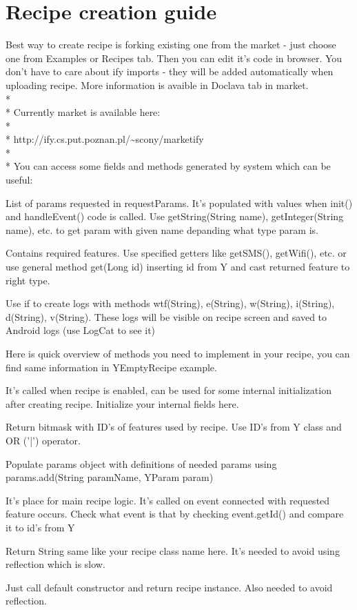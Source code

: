 \documentclass[11pt,a4paper,polish,thesis]{dcsbook}
\begin{document}
\chapter{Recipe creation guide}
Best way to create recipe is forking existing one from the market - just choose one from Examples or Recipes tab. Then you can edit it's code in browser. You don't have to care about ify imports - they will be added automatically when uploading recipe. More information is avaible in Doclava tab in market. \\*\\*
Currently market is available here:\\*\\*
http://ify.cs.put.poznan.pl/\textasciitilde scony/marketify\\*\\*
You can access some fields and methods generated by system which can be useful:
\begin{description}[style=nextline]
\item[getParams()] 
List of params requested in requestParams. It's populated with values when init() and handleEvent() code is called. Use getString(String name), getInteger(String name), etc. to get param with given name depanding what type param is.
\item[getFeatures()] 
Contains required features. Use specified getters like getSMS(), getWifi(), etc. or use general method get(Long id) inserting id from Y and cast returned feature to right type.
\item[Log (it's field)]
Use if to create logs with methods wtf(String), e(String), w(String), i(String), d(String), v(String). These logs will be visible on recipe screen and saved to Android logs (use LogCat to see it)
\end{description}
Here is quick overview of methods you need to implement in your recipe, you can find same information in YEmptyRecipe example.
\begin{description}[style=nextline]
\item[protected void init()]
It's called when recipe is enabled, can be used for some internal initialization after creating recipe. Initialize your internal fields here.
\item[public long requestFeatures()]
Return bitmask with ID's of features used by recipe. Use ID's from Y class and OR ('|') operator.
\item[public void requestParams(YParamList params)]
Populate params object with definitions of needed params using params.add(String paramName, YParam param)
\item[protected void handleEvent(YEvent event)]
It's place for main recipe logic. It's called on event connected with requested feature occurs. Check what event is that by checking event.getId() and compare it to id's from Y
\item[public String getName()]
Return String same like your recipe class name here. It's needed to avoid using reflection which is slow.
\item[public YReceipt newInstance()]
Just call default constructor and return recipe instance. Also needed to avoid reflection.
\end{description}
\end{document}
